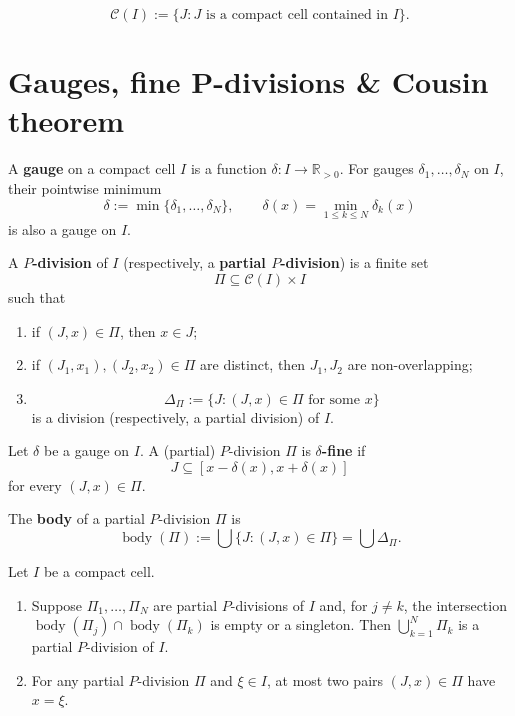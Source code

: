 \begin{notationenv}
\[
    \mathcal C(I)
    :=
    \{J:J\text{ is a compact cell contained in }I\}.
\]
\end{notationenv}


\section{Gauges, fine P-divisions \& Cousin theorem}

\begin{definitionenv}
A \textbf{gauge} on a compact cell $I$ is a function
$\delta:I\to\mathbb R_{>0}$.
For gauges $\delta_1,\ldots,\delta_N$ on $I$, their pointwise minimum
\[
    \delta:=\min\{\delta_1,\ldots,\delta_N\},\qquad
    \delta(x)=\min_{1\le k\le N}\delta_k(x)
\]
is also a gauge on $I$.
\end{definitionenv}

\begin{definitionenv}
A \textbf{$P$-division} of $I$ (respectively, a
\textbf{partial $P$-division}) is a finite set
\[
    \Pi\subseteq\mathcal C(I)\times I
\]
such that
\begin{enumerate}[label=(\arabic*)]
    \item if $(J,x)\in\Pi$, then $x\in J$;
    \item if $(J_1,x_1),(J_2,x_2)\in\Pi$ are distinct, then
    $J_1,J_2$ are non-overlapping;
    \item
    \[
        \Delta_\Pi
        :=
        \{J:(J,x)\in\Pi\text{ for some }x\}
    \]
    is a division (respectively, a partial division) of $I$.
\end{enumerate}
\end{definitionenv}

\begin{definitionenv}
Let $\delta$ be a gauge on $I$. A (partial) $P$-division $\Pi$ is
\textbf{$\delta$-fine} if
\[
    J\subseteq[x-\delta(x),x+\delta(x)]
\]
for every $(J,x)\in\Pi$.
\end{definitionenv}

\begin{notationenv}
The \textbf{body} of a partial $P$-division $\Pi$ is
\[
    \operatorname{body}(\Pi)
    :=\bigcup\{J:(J,x)\in\Pi\}=\bigcup\Delta_\Pi.
\]
\end{notationenv}

\begin{propositionenv}
Let $I$ be a compact cell.
\begin{enumerate}[label=(\Alph*)]
    \item Suppose $\Pi_1,\ldots,\Pi_N$ are partial $P$-divisions of $I$
    and, for $j\ne k$, the intersection
    $\operatorname{body}(\Pi_j)\cap\operatorname{body}(\Pi_k)$
    is empty or a singleton. Then $\bigcup_{k=1}^N\Pi_k$ is a partial
    $P$-division of $I$.
    \item For any partial $P$-division $\Pi$ and $\xi\in I$, at most two
    pairs $(J,x)\in\Pi$ have $x=\xi$.
\end{enumerate}
\end{propositionenv}


